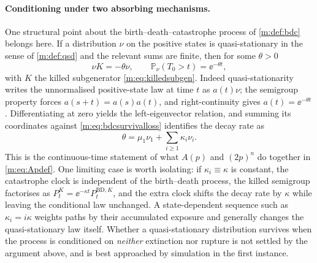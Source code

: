 \paragraph{Conditioning under two absorbing mechanisms.}
One structural point about the birth--death--catastrophe process of
\cref{m:def:bdc} belongs here. If a distribution $\nu$ on the positive states is
quasi-stationary in the sense of \cref{m:def:qsd} and the relevant sums are finite,
then for some $\theta>0$
\begin{equation}
\label{m:eq:bdcqsdeigen}
\nu K = -\theta\nu,
\qquad
\mathbb{P}_\nu\!\left(T_0>t\right) = \ee^{-\theta t},
\end{equation}
with $K$ the killed subgenerator \cref{m:eq:killedsubgen}. Indeed
quasi-stationarity writes the unnormalised positive-state law at time $t$ as
$a(t)\nu$; the semigroup property forces $a(s+t)=a(s)a(t)$, and right-continuity
gives $a(t)=\ee^{-\theta t}$. Differentiating at zero yields the left-eigenvector
relation, and summing its coordinates against \cref{m:eq:bdcsurvivalloss}
identifies the decay rate as
\begin{equation}
\label{m:eq:bdcdecayrate}
\theta = \mu_1\nu_1 + \sum_{i\ge1}\kappa_i\nu_i .
\end{equation}
This is the continuous-time statement of what $A(p)$ and $(2p)^n$ do together in
\cref{m:eq:Apdef}. One limiting case is worth
isolating: if $\kappa_i\equiv\kappa$ is constant, the catastrophe clock is
independent of the birth--death process, the killed semigroup factorises as
$P^K_t = \ee^{-\kappa t}P^{\mathrm{BD},K}_t$, and the extra clock shifts the decay
rate by $\kappa$ while leaving the conditional law unchanged. A state-dependent
sequence such as $\kappa_i=i\kappa$ weights paths by their accumulated exposure and
generally changes the quasi-stationary law itself. Whether a quasi-stationary
distribution survives when the process is conditioned on \emph{neither} extinction
nor rupture is not settled by the argument above, and is best approached by
simulation in the first instance.

